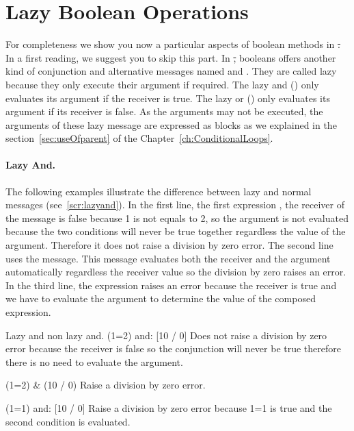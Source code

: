 \section{Lazy Boolean Operations}
For completeness we show you now a particular aspects of boolean methods in \st. In a first reading, we suggest you to skip this part. In \st, booleans offers another kind of conjunction and alternative messages named  and . They are called lazy because they only execute their argument if required. The lazy and () only evaluates its argument if the receiver is true. The lazy or () only evaluates its argument if its receiver is false. 
As the arguments may not be executed, the arguments of these lazy message are expressed as blocks as we explained in the section~\ref{sec:useOfparent} of the Chapter~\ref{ch:ConditionalLoops}.




\paragraph{Lazy And.}
The following examples illustrate the difference between lazy and normal messages (see~\ref{scr:lazyand}). In the first line, the first expression , the receiver of the message  is false because 1 is not equals to 2, so the argument is not evaluated because the two conditions will never be true together regardless the value of the argument. Therefore it does not raise a division by zero error. The second line uses the \ct{\&} message. This message evaluates both the receiver and the argument automatically regardless the receiver value so the division by zero raises an error.  In the third line, the expression raises an error because the receiver is true and we have to evaluate the argument to determine the value of the composed expression.

\begin{scriptwithtitle}{Lazy and non lazy and.}\label{scr:lazyand}
(1=2) and: [10 / 0]
\textrm{Does not raise a division by zero error because the receiver is false so the conjunction will never be true therefore there is no need to evaluate the argument.}

(1=2) & (10 / 0)
\textrm{Raise a division by zero error.}

(1=1) and: [10 / 0]
\textrm{Raise a division by zero error because 1=1 is true and the second condition is evaluated.}
\end{scriptwithtitle}

